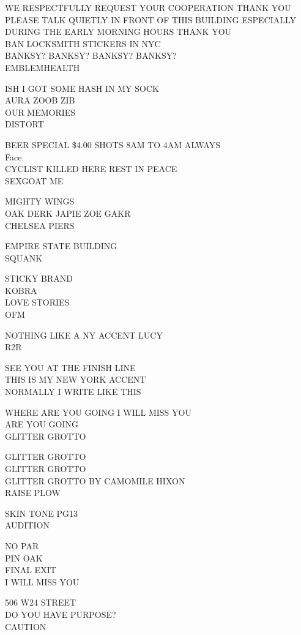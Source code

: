 \documentclass[10pt,letterpaper]{article}
\begin{document}
WE RESPECTFULLY REQUEST YOUR COOPERATION THANK YOU PLEASE TALK QUIETLY IN FRONT OF THIS BUILDING ESPECIALLY DURING THE EARLY MORNING HOURS THANK YOU\\
BAN LOCKSMITH STICKERS IN NYC\\
BANKSY? BANKSY? BANKSY? BANKSY?\\
EMBLEMHEALTH

ISH I GOT SOME HASH IN MY SOCK\\
AURA ZOOB ZIB\\
OUR MEMORIES\\
DISTORT

BEER SPECIAL \$4.00 SHOTS 8AM TO 4AM ALWAYS\\
Face\\
CYCLIST KILLED HERE REST IN PEACE\\
SEXGOAT ME

MIGHTY WINGS\\
OAK DERK JAPIE ZOE GAKR\\
CHELSEA PIERS

EMPIRE STATE BUILDING\\
SQUANK

STICKY BRAND\\
KOBRA\\
LOVE STORIES\\
OFM

NOTHING LIKE A NY ACCENT LUCY\\
R2R

SEE YOU AT THE FINISH LINE\\
THIS IS MY NEW YORK ACCENT\\
NORMALLY I WRITE LIKE THIS

WHERE ARE YOU GOING I WILL MISS YOU\\
ARE YOU GOING\\
GLITTER GROTTO

GLITTER GROTTO\\
GLITTER GROTTO\\
GLITTER GROTTO BY CAMOMILE HIXON\\
RAISE PLOW

SKIN TONE PG13\\
AUDITION

NO PAR\\
PIN OAK\\
FINAL EXIT\\
I WILL MISS YOU

506 W24 STREET\\
DO YOU HAVE PURPOSE?\\
CAUTION
\end{document}
